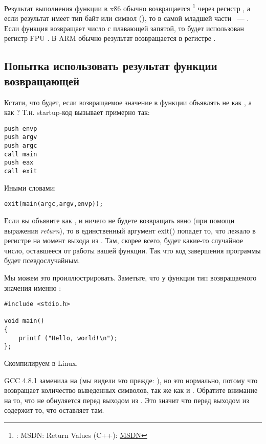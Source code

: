 
Результат выполнения функции в x86 обычно возвращается
\footnote{\Seealso: MSDN: Return Values (C++): \href{http://go.yurichev.com/17258}{MSDN}}
через регистр \EAX, а если результат имеет тип байт или символ (\Tchar), 
то в самой младшей части \EAX~--- \AL. Если функция возвращает число с плавающей запятой, 
то будет использован регистр FPU .
В ARM обычно результат возвращается в регистре .

\subsection{Попытка использовать результат функции возвращающей \Tvoid}
\label{UseResultOfVoidFunc}

Кстати, что будет, если возвращаемое значение в функции \main объявлять не как \Tint, а как \Tvoid?
Т.н. startup-код вызывает \main примерно так:

\begin{lstlisting}[style=customasmx86]
push envp
push argv
push argc
call main
push eax
call exit
\end{lstlisting}

Иными словами:

\begin{lstlisting}[style=customc]
exit(main(argc,argv,envp));
\end{lstlisting}

Если вы объявите \main как \Tvoid, и ничего не будете возвращать явно (при помощи выражения \emph{return}), то в единственный аргумент exit() попадет то, что лежало в регистре \EAX на момент выхода из \main.
Там, скорее всего, будет какие-то случайное число, оставшееся от работы вашей функции. Так что код завершения программы будет псевдослучайным.

Мы можем это проиллюстрировать.
Заметьте, что у функции \main тип возвращаемого значения именно \Tvoid{}:

\begin{lstlisting}[style=customc]
#include <stdio.h>

void main()
{
	printf ("Hello, world!\n");
};
\end{lstlisting}

Скомпилируем в Linux.

GCC 4.8.1 заменила \printf на \puts 
(мы видели это прежде: ), но это нормально, потому что \puts возвращает количество
выведенных символов, так же как и \printf.
Обратите внимание на то, что \EAX не обнуляется перед выходом из \main.
Это значит что \EAX перед выходом из \main содержит то, что \puts оставляет там.

